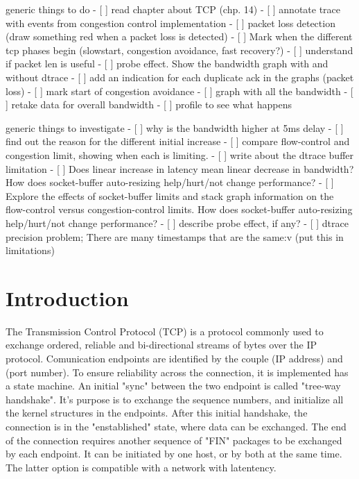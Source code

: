 \documentclass[a4paper,10pt]{article}
\begin{document}
generic things to do 
- [ ] read chapter about TCP (chp. 14)
- [ ] annotate trace with events from congestion control implementation
- [ ] packet loss detection (draw something red when a packet loss is detected)
- [ ] Mark when  the different tcp phases begin (slowstart, congestion avoidance, fast recovery?)
- [ ] understand if packet len is useful
- [ ] probe effect. Show the bandwidth graph with and without dtrace
- [ ] add an indication for each duplicate ack in the graphs (packet loss)
- [ ] mark start of congestion avoidance
- [ ] graph with all the bandwidth
- [ ] retake data for overall bandwidth
- [ ] profile to see what happens

generic things to investigate
- [ ] why is the bandwidth higher at 5ms delay
- [ ] find out the reason for the different initial increase
- [ ] compare flow-control and congestion limit, showing when each is limiting.
- [ ] write about the dtrace buffer limitation
- [ ] Does linear increase in latency mean linear decrease in bandwidth? How does socket-buffer auto-resizing help/hurt/not change performance?
- [ ] Explore the effects of socket-buffer limits and stack graph information on the flow-control versus congestion-control limits. How does socket-buffer auto-resizing help/hurt/not change performance? 
- [ ] describe probe effect, if any?
- [ ] dtrace precision problem; There are many timestamps that are the same:v (put this in limitations)
\fi

\clearpage

\setcounter{page}{1}

\section{Introduction}

The Transmission Control Protocol (TCP) is a protocol commonly used to exchange ordered, reliable and bi-directional streams of bytes over the IP protocol. Comunication endpoints are identified by the couple (IP address) and (port number). 
To ensure reliability across the connection, it is implemented has a state machine. An initial "sync" between the two endpoint is called "tree-way handshake". It's purpose is to exchange the sequence numbers, and initialize all the kernel structures in the endpoints.
After this initial handshake, the connection is in the "enstablished" state, where data can be exchanged.
The end of the connection requires another sequence of "FIN" packages to be exchanged by each endpoint. It can be initiated by one host, or by both at the same time. The latter option is compatible with a network with latentency.
\end{document}
